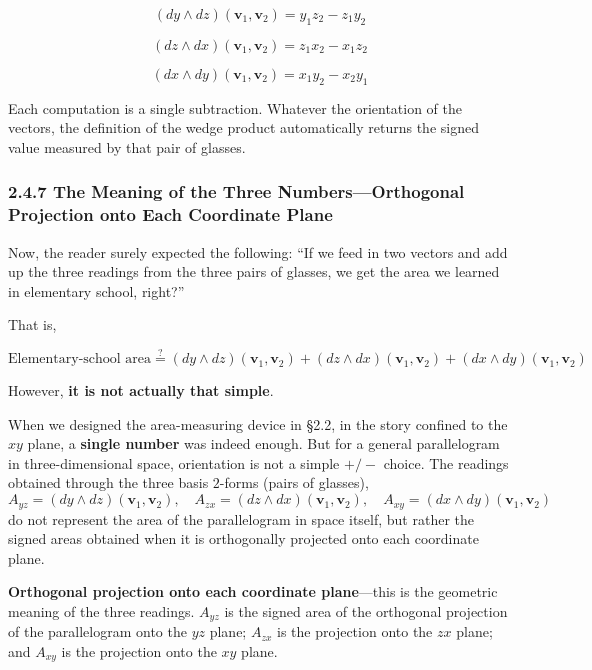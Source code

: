 \documentclass[a4paper,12pt,openany]{book}
\begin{document}
\[
(dy \wedge dz)(\mathbf{v}_1, \mathbf{v}_2) = y_1 z_2 - z_1 y_2
\]

\[
(dz \wedge dx)(\mathbf{v}_1, \mathbf{v}_2) = z_1 x_2 - x_1 z_2
\]

\[
(dx \wedge dy)(\mathbf{v}_1, \mathbf{v}_2) = x_1 y_2 - x_2 y_1
\]

Each computation is a single subtraction. Whatever the orientation of
the vectors, the definition of the wedge product automatically returns
the signed value measured by that pair of glasses.

\hypertarget{the-meaning-of-the-three-numbersorthogonal-projection-onto-each-coordinate-plane}{%
\subsubsection{2.4.7 The Meaning of the Three Numbers—Orthogonal
Projection onto Each Coordinate
Plane}\label{the-meaning-of-the-three-numbersorthogonal-projection-onto-each-coordinate-plane}}

Now, the reader surely expected the following: ``If we feed in two
vectors and add up the three readings from the three pairs of glasses,
we get the area we learned in elementary school, right?''

That is,

\[
\text{Elementary-school area} \stackrel{?}{=} (dy \wedge dz)(\mathbf{v}_1, \mathbf{v}_2) + (dz \wedge dx)(\mathbf{v}_1, \mathbf{v}_2) + (dx \wedge dy)(\mathbf{v}_1, \mathbf{v}_2)
\]

However, \textbf{it is not actually that simple}.

When we designed the area-measuring device in §2.2, in the story
confined to the \(xy\) plane, a \textbf{single number} was indeed
enough. But for a general parallelogram in three-dimensional space,
orientation is not a simple \(+/-\) choice. The readings obtained
through the three basis \(2\)-forms (pairs of glasses),
\[A_{yz} = (dy \wedge dz)(\mathbf{v}_1,\mathbf{v}_2),\quad A_{zx} = (dz \wedge dx)(\mathbf{v}_1,\mathbf{v}_2),\quad A_{xy} = (dx \wedge dy)(\mathbf{v}_1,\mathbf{v}_2)\]
do not represent the area of the parallelogram in space itself, but
rather the signed areas obtained when it is orthogonally projected onto
each coordinate plane.

\textbf{Orthogonal projection onto each coordinate plane}—this is the
geometric meaning of the three readings. \(A_{yz}\) is the signed area
of the orthogonal projection of the parallelogram onto the \(yz\) plane;
\(A_{zx}\) is the projection onto the \(zx\) plane; and \(A_{xy}\) is
the projection onto the \(xy\) plane.
\end{document}
